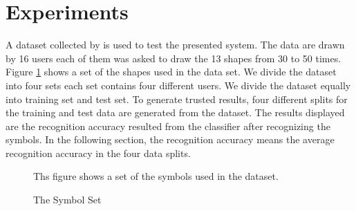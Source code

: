 \documentclass[a4paper,10pt]{IEEEconf}
\begin{document}
\section{Experiments}\label{sec:Experiments}
A dataset collected by \citeauthor{HeloiseBeautification} is used to test the presented system\cite{HeloiseBeautification}. The data are drawn by 16 users each of them was asked to draw the 13 shapes from 30 to 50 times. Figure \ref{fig:symbolSet} shows a set of the shapes used in the data set. We divide the dataset into four sets each set contains four different users. We divide the dataset equally into training set and test set. To generate trusted results, four different splits for the training and test data are generated from the dataset. The results displayed are the recognition accuracy resulted from the classifier after recognizing the symbols. In the following section, the recognition accuracy means the average recognition accuracy in the four data splits. %
\begin{figure}[]\centering
{}
	\caption{The Symbol Set} Ths figure shows a set of the symbols used in the dataset. 
	\label{fig:symbolSet}
\end{figure}
\end{document}
